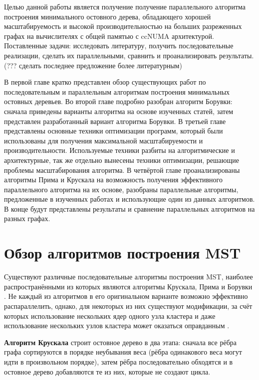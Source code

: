 \documentclass[a4paper,12pt]{extarticle}
\let\stdsection\section
\renewcommand\section{
    \newpage
    \stdsection
}
\begin{document}

Целью данной работы является получение получение параллельного алгоритма построения минимального остовного дерева, обладающего хорошей масштабируемость и высокой производительностью на больших разреженных графах на вычислителях с общей памятью с ccNUMA архитектурой.
Поставленные задачи: исследовать литературу, получить последовательные реализации, сделать их параллельными, сравнить и проанализировать результаты. (??? сделать последнее предложение более литературным)

В первой главе кратко представлен обзор существующих работ по последовательным и параллельным алгоритмам построения минимальных остовных деревьев.
Во второй главе подробно разобран алгоритм Борувки: сначала приведены варианты алгоритма на основе изученных статей, затем представлен разработанный вариант алгоритма Борувки.
В третьей главе представлены основные техники оптимизации программ, который были использованы для получения максимальной масштабируемости и производительности.
Используемые техники разбиты на алгоритмические и архитектурные, так же отдельно вынесены техники оптимизации, решающие проблемы масштабирования алгоритма.
В четвёртой главе проанализированы алгоритмы Прима и Крускала на возможность получения эффективного параллельного алгоритма на их основе, разобраны параллельные алгоритмы, предложенные в изученных работах и использующие один из данных алгоритмов.
В конце будут представлены результаты и сравнение параллельных алгоритмов на разных графах.



\section{Обзор алгоритмов построения MST}
\label{sec:reviewSeq}

Существуют различные последовательные алгоритмы построения MST, наиболее распространёнными из которых являются алгоритмы Крускала, Прима и Борувки \cite{cormen}.
Не каждый из алгоритмов в его оригинальном варианте возможно эффективно распараллелить, однако, для некоторых из них существуют модификации, за счёт которых использование нескольких ядер одного узла кластера и даже использование нескольких узлов кластера может оказаться оправданным \cite{boruvka-prima,kruskal-parallel}.

\textbf{Алгоритм Крускала} строит остовное дерево в два этапа: сначала все рёбра графа сортируются в порядке неубывания веса (рёбра одинакового веса могут идти в произвольном порядке), затем рёбра последовательно обходятся и в остовное дерево добавляются те из них, которые не создают цикла.
\end{document}
